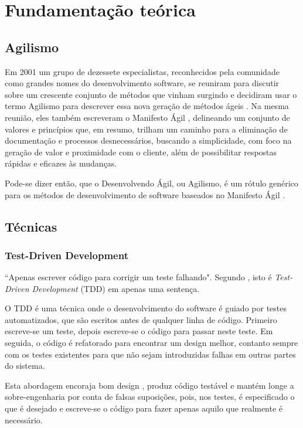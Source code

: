 \chapter{Fundamentação teórica}

\section{Agilismo}

Em 2001 um grupo de dezessete especialistas, reconhecidos pela comunidade como grandes nomes do desenvolvimento software, se reuniram para discutir sobre um crescente conjunto de métodos que vinham surgindo e decidiram usar o termo Agilismo para descrever essa nova geração de métodos ágeis \cite{AgileStory}. Na mesma reunião, eles também escreveram o Manifesto Ágil \cite{AgileManifesto}, delineando um conjunto de valores e princípios que, em resumo, trilham um caminho para a eliminação de documentação e processos desnecessários, buscando a simplicidade, com foco na geração de valor e proximidade com o cliente, além de possibilitar respostas rápidas e eficazes às mudanças.

Pode-se dizer então, que o Desenvolvendo Ágil, ou Agilismo, é um rótulo genérico para os métodos de desenvolvimento de software baseados no Manifesto Ágil \cite{BDDRodrigo}.


\section{Técnicas}

\subsection{Test-Driven Development}
\label{sub:tdd}
``Apenas escrever código para corrigir um teste falhando". Segundo , isto é \textit{Test-Driven Development} (TDD) \cite{TDDbyExample} em apenas uma sentença.

O TDD é uma técnica onde o desenvolvimento do software é guiado por testes automatizados, que são escritos antes de qualquer linha de código. Primeiro escreve-se um teste, depois escreve-se o código para passar neste teste. Em seguida, o código é refatorado para encontrar um design melhor, contanto sempre com os testes existentes para que não sejam introduzidas falhas em outras partes do sistema.

Esta abordagem encoraja bom design \cite{GrowingOOByTests}, produz código testável e mantém longe a sobre-engenharia por conta de falsas suposições, pois, nos testes, é especificado o que é desejado e escreve-se o código para fazer apenas aquilo que realmente é necessário. \cite{TestDrivenKoskela, TDDbyExample, EmpiricalTDD}

